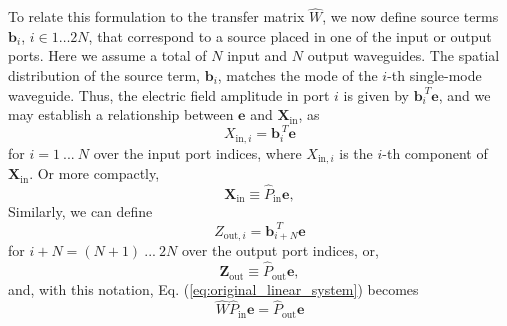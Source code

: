 To relate this formulation to the transfer matrix $\hat{W}$, we now define source terms $\mathbf{b}_i$, $i \in 1 \dots 2N$, that correspond to a source placed in one of the input or output ports.  Here we assume a total of $N$  input and $N$ output waveguides.  The spatial distribution of the source term, $\mathbf{b}_i$, matches the mode of the $i$-th single-mode waveguide. Thus, the electric field amplitude in port $i$ is given by $\mathbf{b}_i^{\ T} \mathbf{e}$, and we may establish a relationship between $\mathbf{e}$ and $\mathbf{X}_\textrm{in}$, as
\begin{equation}
X_{\textrm{in},i} = \mathbf{b}_i^{\ T} \mathbf{e}
\end{equation}
for $i = 1~...~N$ over the input port indices, where $X_{\textrm{in},i}$ is the $i$-th component of $\mathbf{X}_\textrm{in}$. Or more compactly, 
\begin{equation}
\mathbf{X}_\textrm{in} \equiv \hat{P}_{\textrm{in}} \mathbf{e},
\label{eq:basis_conversion_in}
\end{equation}
Similarly, we can define 
\begin{equation}
Z_{\textrm{out},i} = \mathbf{b}_{i+N}^{\ T} \mathbf{e}
\end{equation}
for $i+N = (N+1)~...~2N$ over the output port indices, or, 
\begin{equation}
\mathbf{Z}_\textrm{out} \equiv \hat{P}_{\textrm{out}} \mathbf{e},
\label{eq:basis_conversion_in}
\end{equation}
and, with this notation, Eq. (\ref{eq:original_linear_system}) becomes
\begin{equation}
\hat{W}\hat{P}_{\textrm{in}}\mathbf{e} = \hat{P}_{\textrm{out}}\mathbf{e}
\label{eq:summary_of_basis_change}
\end{equation}


